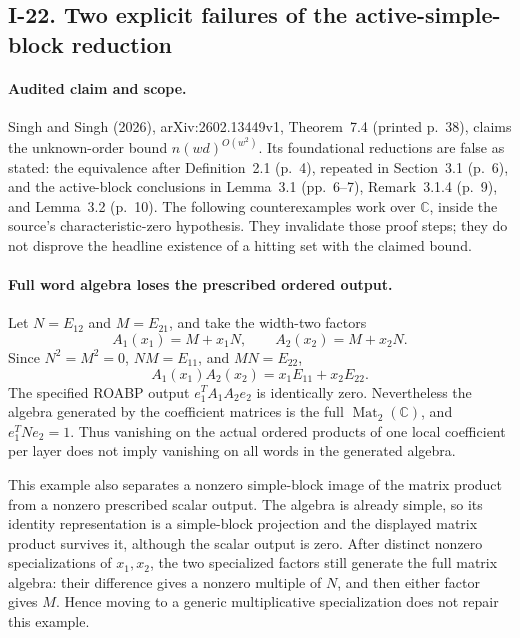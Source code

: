 \subsection{I-22. Two explicit failures of the active-simple-block reduction}
\label{I-22}

\paragraph{Audited claim and scope.}
Singh and Singh (2026), arXiv:2602.13449v1, Theorem~7.4
(printed p.~38), claims the unknown-order bound
$n(wd)^{O(w^2)}$.  Its foundational reductions are false as stated:
the equivalence after Definition~2.1 (p.~4), repeated in
Section~3.1 (p.~6), and the active-block conclusions in
Lemma~3.1 (pp.~6--7), Remark~3.1.4 (p.~9), and Lemma~3.2
(p.~10).  The following counterexamples work over $\mathbb C$,
inside the source's characteristic-zero hypothesis.  They
invalidate those proof steps; they do not disprove the headline
existence of a hitting set with the claimed bound.

\paragraph{Full word algebra loses the prescribed ordered output.}
Let $N=E_{12}$ and $M=E_{21}$, and take the width-two factors
\[
 A_1(x_1)=M+x_1N,\qquad A_2(x_2)=M+x_2N.
\]
Since $N^2=M^2=0$, $NM=E_{11}$, and $MN=E_{22}$,
\[
 A_1(x_1)A_2(x_2)=x_1E_{11}+x_2E_{22}.
\]
The specified ROABP output $e_1^TA_1A_2e_2$ is identically zero.
Nevertheless the algebra generated by the coefficient matrices
is the full $\operatorname{Mat}_2(\mathbb C)$, and
$e_1^TNe_2=1$.  Thus vanishing on the actual ordered products
of one local coefficient per layer does not imply vanishing on
all words in the generated algebra.

This example also separates a nonzero simple-block image of the
matrix product from a nonzero prescribed scalar output.  The
algebra is already simple, so its identity representation is a
simple-block projection and the displayed matrix product survives
it, although the scalar output is zero.  After distinct nonzero
specializations of $x_1,x_2$, the two specialized factors still
generate the full matrix algebra: their difference gives a
nonzero multiple of $N$, and then either factor gives $M$.
Hence moving to a generic multiplicative specialization does not
repair this example.

